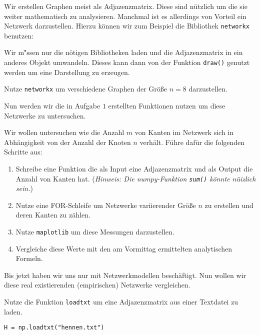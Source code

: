 \exercise[%
  topic=Netzwerke mit Python darstellen
    ]

Wir erstellen Graphen meist als Adjazenzmatrix. Diese sind n\"utzlich um die sie weiter mathematisch zu analysieren. Manchmal ist es allerdings von Vorteil ein Netzwerk darzustellen. Hierzu k\"onnen wir zum Beispiel die Bibliothek {\tt networkx} benutzen:  



Wir m\u"ssen nur die n\"otigen Bibliotheken laden und die Adjazenzmatrix in ein anderes Objekt umwandeln. Dieses kann dann von der Funktion {\tt draw()} genutzt werden um eine Darstellung zu erzeugen.

Nutze {\tt networkx} um verschiedene Graphen der Gr\"o\ss e $n=8$ darzustellen.

  \exercise[%
  topic=Netzwerke mit Python untersuchen
    ]
Nun werden wir die in Aufgabe $1$ erstellten Funktionen nutzen um diese Netzwerke zu untersuchen.

 \subexercise[%
  topic=Kanten z\"ahlen,
    ]

Wir wollen untersuchen wie die Anzahl $m$ von Kanten im Netzwerk sich in Abh\"angigkeit von der Anzahl der Knoten $n$ verh\"alt. F\"uhre daf\"ur die folgenden Schritte aus:

\begin{enumerate}
\item Schreibe eine Funktion die als Input eine Adjazenzmatrix und als Output die Anzahl von Kanten hat. (\emph{Hinweis: Die numpy-Funktion {\tt sum()} k\"onnte n\"uizlich sein.})
\item Nutze eine FOR-Schleife um Netzwerke variierender Gr\"o\ss e $n$ zu erstellen und deren Kanten zu z\"ahlen.
\item Nutze {\tt maplotlib} um diese Messungen darzustellen. 
\item Vergleiche diese Werte mit den am Vormittag ermittelten analytischen Formeln.
\end{enumerate}



 \subexercise[%
  topic=Vergleich mit empirischen Netzwerken,
    ]

Bis jetzt haben wir uns nur mit Netzwerkmodellen besch\"aftigt. Nun wollen wir diese real existierenden (empirischen) Netzwerke vergleichen.

Nutze die Funktion {\tt loadtxt} um eine Adjazenzmatrix aus einer Textdatei zu laden.

\begin{lstlisting}
H = np.loadtxt("hennen.txt")
\end{lstlisting}

